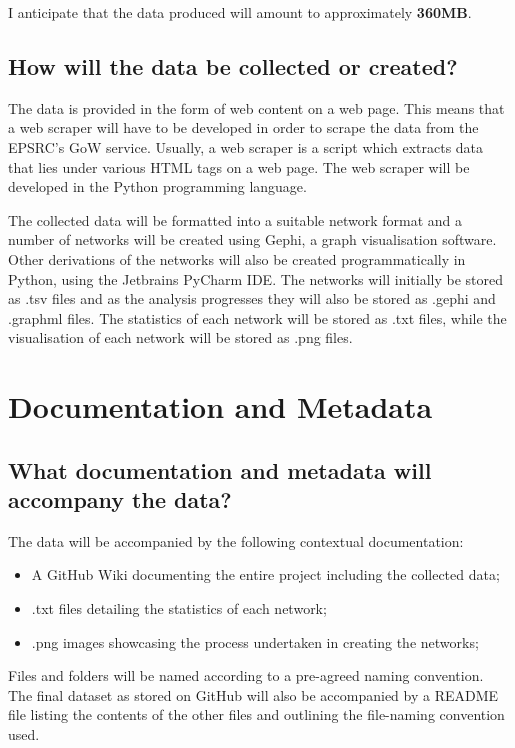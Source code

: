 \documentclass{article} %
\begin{document}
I anticipate that the data produced will amount to approximately \textbf{360MB}.

\subsection{How will the data be collected or created?}

The data is provided in the form of web content on a web page. This means that a web scraper will have to be developed in order to scrape the data from the EPSRC’s GoW service. Usually, a web scraper is a script which extracts data that lies under various HTML tags on a web page. The web scraper will be developed in the Python programming language.

The collected data will be formatted into a suitable network format and a number of networks will be created using Gephi, a graph visualisation software. Other derivations of the networks will also be created programmatically in Python, using the Jetbrains PyCharm IDE. The networks will initially be stored as .tsv files and as the analysis progresses they will also be stored as .gephi and .graphml files. The statistics of each network will be stored as .txt files, while the visualisation of each network will be stored as .png files.

\section{Documentation and Metadata}

\subsection{What documentation and metadata will accompany the data?}

The data will be accompanied by the following contextual documentation:

\begin{itemize}
    \item A GitHub Wiki documenting the entire project including the collected data;
    \item .txt files detailing the statistics of each network;
    \item .png images showcasing the process undertaken in creating the networks;
\end{itemize}

Files and folders will be named according to a pre-agreed naming convention. The final dataset as stored on GitHub will also be accompanied by a README file listing the contents of the other files and outlining the file-naming convention used.
\end{document}
